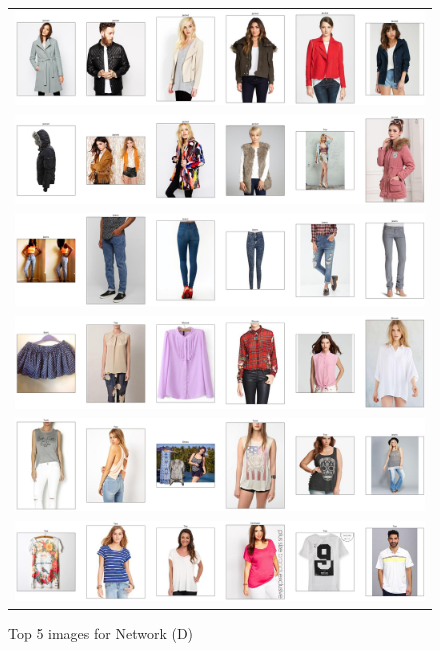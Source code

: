 \documentclass{article}
\begin{document}
\begin{figure}
\begin{tabular}{c}
{\includegraphics[width = 5in]{d/search_idx_3012.png}}\\
{\includegraphics[width = 5in]{d/search_idx_3013.png}}\\
{\includegraphics[width = 5in]{d/search_idx_4002.png}}\\
{\includegraphics[width = 5in]{d/search_idx_7513.png}}\\
{\includegraphics[width = 5in]{d/search_idx_8716.png}}\\
{\includegraphics[width = 5in]{d/search_idx_9388.png}}
\end{tabular}
\caption{Top 5 images for Network (D)}
\label{fig:img_netD}
\end{figure}
\end{document}
